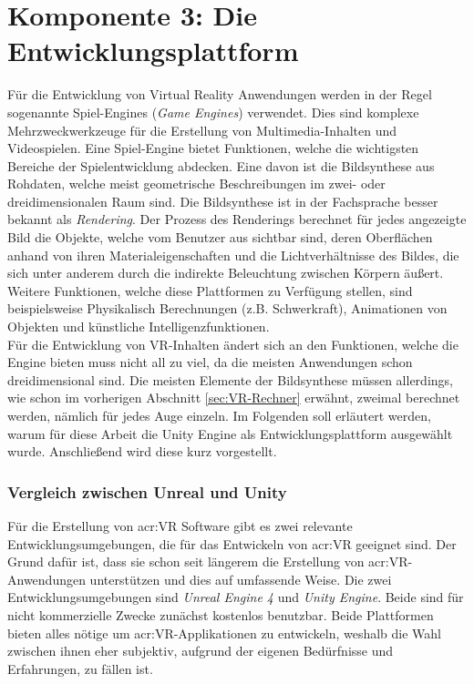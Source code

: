 \section{Komponente 3: Die Entwicklungsplattform}
\label{sec:VREngine}

Für die Entwicklung von Virtual Reality Anwendungen werden in der Regel sogenannte Spiel-Engines (\textit{Game Engines}) verwendet. Dies sind komplexe Mehrzweckwerkzeuge für die Erstellung von Multimedia-Inhalten und Videospielen. Eine Spiel-Engine bietet Funktionen, welche die wichtigsten Bereiche der Spielentwicklung abdecken. Eine davon ist die Bildsynthese aus Rohdaten, welche meist geometrische Beschreibungen im zwei- oder dreidimensionalen Raum sind. Die Bildsynthese ist in der Fachsprache besser bekannt als \textit{Rendering}. Der Prozess des Renderings berechnet für jedes angezeigte Bild die Objekte, welche vom Benutzer aus sichtbar sind, deren Oberflächen anhand von ihren Materialeigenschaften und die Lichtverhältnisse des Bildes, die sich unter anderem durch die indirekte Beleuchtung zwischen Körpern äußert. Weitere Funktionen, welche diese Plattformen zu Verfügung stellen, sind beispielsweise Physikalisch Berechnungen (z.B. Schwerkraft), Animationen von Objekten und künstliche Intelligenzfunktionen.\\

Für die Entwicklung von VR-Inhalten ändert sich an den Funktionen, welche die Engine bieten muss nicht all zu viel, da die meisten Anwendungen schon dreidimensional sind. Die meisten Elemente der Bildsynthese müssen allerdings, wie schon im vorherigen Abschnitt \ref{sec:VR-Rechner} erwähnt, zweimal berechnet werden, nämlich für jedes Auge einzeln. Im Folgenden soll erläutert werden, warum für diese Arbeit die Unity Engine als Entwicklungsplattform ausgewählt wurde. Anschließend wird diese kurz vorgestellt.  

\subsubsection{Vergleich zwischen Unreal und Unity}

Für die Erstellung von \acrlong{acr:VR} Software gibt es zwei relevante Entwicklungsumgebungen, die für das Entwickeln von \acrlong{acr:VR} geeignet sind. Der Grund dafür ist, dass sie schon seit längerem die Erstellung von \acrshort{acr:VR}-Anwendungen unterstützen und dies auf umfassende Weise. Die zwei Entwicklungsumgebungen sind \textit{Unreal Engine 4} und \textit{Unity Engine}. Beide sind für nicht kommerzielle Zwecke zunächst kostenlos benutzbar. Beide Plattformen bieten alles nötige um \acrshort{acr:VR}-Applikationen zu entwickeln, weshalb die Wahl zwischen ihnen eher subjektiv, aufgrund der eigenen Bedürfnisse und Erfahrungen, zu fällen ist.\\ 

